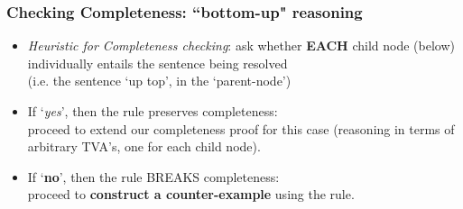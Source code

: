 \iffalse
\begin{frame}
\frametitle{Modifying system STD}

\begin{itemize}[<+->]

\item What if we had chosen an alternative rule(s)? 

\item Simplest case: we swap out one of our nine rules for a different rule, i.e. for a given connective or negated connective. 

\item Call our modified system `$STD^{\ast}$'%




\item Would our modified system $STD^{\ast}$ remain Sound?

\item Would our modified system $STD^{\ast}$ remain Complete?

\end{itemize}
\end{frame}
\fi 



\begin{frame}
\frametitle{Checking Completeness: ``bottom-up" reasoning}

\begin{itemize}[<+->]

\item \emph{Heuristic for Completeness checking}: ask whether \textbf{EACH} child node (below) individually entails the sentence being resolved \\ (i.e. the sentence `up top', in the `parent-node')


\item If `\emph{yes}', then the rule preserves completeness: \\ proceed to extend our completeness proof for this case (reasoning in terms of arbitrary TVA's, one for each child node). 

\item If `\textbf{\textcolor{OGlyallpink}{no}}', then the rule BREAKS completeness: \\ proceed to \textbf{\textcolor{OGlyallpink}{construct a counter-example}} using the rule. 

\end{itemize}
\end{frame}

